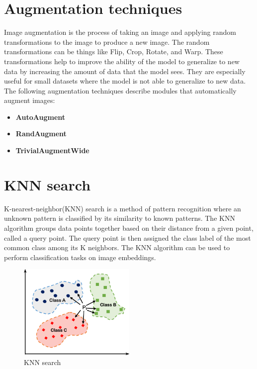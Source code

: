 \documentclass[12pt,a4paper]{report}
\begin{document}
\section{Augmentation techniques}
Image augmentation is the process of taking an image and applying random transformations to the image to produce a new image.
The random transformations can be things like Flip, Crop, Rotate, and Warp.
These transformations help to improve the ability of the model to generalize to new data by increasing the amount of data that the model sees.
They are especially useful for small datasets where the model is not able to generalize to new data.
The following augmentation techniques describe modules that automatically augment images:
\begin{itemize}
	\item \textbf{AutoAugment} \cite{AutoAugment}
 	\item \textbf{RandAugment} \cite{RandAugment}
  	\item \textbf{TrivialAugmentWide} \cite{TrivialAugmentWide}
\end{itemize}

\section{KNN search}
K-nearest-neighbor(KNN) search is a method of pattern recognition where an unknown pattern is classified by its similarity to known patterns.
The KNN algorithm groups data points together based on their distance from a given point, called a query point.
The query point is then assigned the class label of the most common class among its K neighbors.
The KNN algorithm can be used to perform classification tasks on image embeddings.


\begin{figure}[h]
    \centering
    \includegraphics[width=0.5\textwidth]{./images/knn.png}
	\caption{KNN search}
\end{figure}
\end{document}
